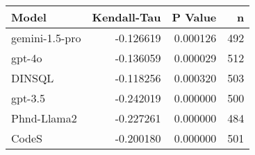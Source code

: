 \begin{tabular}{lrrr}
\toprule
Model & Kendall-Tau & P Value & n \\
\midrule
gemini-1.5-pro & -0.126619 & 0.000126 & 492 \\
gpt-4o & -0.136059 & 0.000029 & 512 \\
DINSQL & -0.118256 & 0.000320 & 503 \\
gpt-3.5 & -0.242019 & 0.000000 & 500 \\
Phnd-Llama2 & -0.227261 & 0.000000 & 484 \\
CodeS & -0.200180 & 0.000000 & 501 \\
\bottomrule
\end{tabular}
